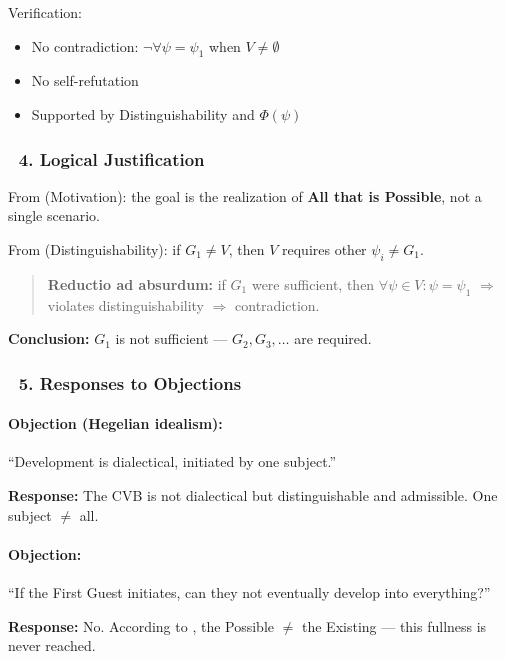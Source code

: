 \documentclass[12pt]{article}
\begin{document}
Verification:

\begin{itemize}
\item No contradiction: $\neg\forall\psi = \psi_1$ when $V \neq \emptyset$
\item No self-refutation
\item Supported by \text{[5]} Distinguishability and \text{[11.1.1]} $\Phi(\psi)$
\end{itemize}

\subsubsection*{🔹 4. Logical Justification}

From \text{[16]} (Motivation): the goal is the realization of \textbf{All that is Possible}, not a single scenario.

From \text{[5]} (Distinguishability): if $G_1 \neq V$, then $V$ requires other $\psi_i \neq G_1$.

\begin{quote}
\textbf{Reductio ad absurdum:} if $G_1$ were sufficient, then $\forall\psi \in V: \psi = \psi_1$ $\Rightarrow$ violates distinguishability $\Rightarrow$ contradiction.
\end{quote}

\textbf{Conclusion:} $G_1$ is not sufficient — $G_2, G_3, \dots$ are required.

\subsubsection*{🔹 5. Responses to Objections}

\paragraph{Objection (Hegelian idealism):}
``Development is dialectical, initiated by one subject.''

\textbf{Response:} The CVB is not dialectical but distinguishable and admissible. One subject $\neq$ all.

\bigskip

\paragraph{Objection:}
``If the First Guest initiates, can they not eventually develop into everything?''

\textbf{Response:} No. According to \text{[5]}, the Possible $\neq$ the Existing — this fullness is never reached.
\end{document}
